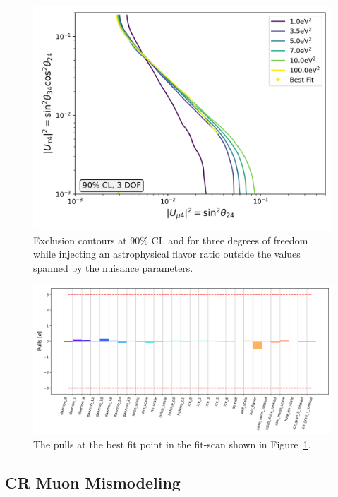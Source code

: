 \documentclass[main.tex]{subfiles}
\begin{document}
\begin{figure}
    \centering
    \includegraphics[width=0.7\linewidth]{figures/joint_astro_flavor_misfit_Realization_daemon_badflavor_Asimov_sterile_0_cl0.9_dof3.png}
    \caption{Exclusion contours at 90\% CL and for three degrees of freedom while injecting an astrophysical flavor ratio outside the values spanned by the nuisance parameters.}\label{fig:flavor_mismodel}
\end{figure}

\begin{figure}
    \centering
    \includegraphics[width=0.7\linewidth]{figures/pulls_Realization_daemon_badflavor_Asimov_sterile_0_joint_astro_flavor_misfit.png}
    \caption{The pulls at the best fit point in the fit-scan shown in Figure~\ref{fig:flavor_mismodel}.}\label{fig:flavor_mismodel_pulls}
\end{figure}

\subsection{CR Muon Mismodeling}
\end{document}
